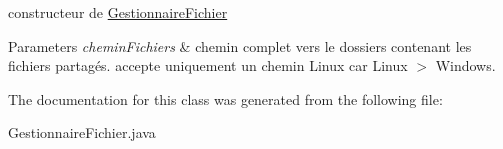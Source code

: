 constructeur de \hyperlink{classcommon_1_1GestionnaireFichier}{Gestionnaire\+Fichier} 


\begin{DoxyParams}{Parameters}
{\em chemin\+Fichiers} & chemin complet vers le dossiers contenant les fichiers partagés. accepte uniquement un chemin Linux car Linux $>$ Windows. \\
\hline
\end{DoxyParams}


The documentation for this class was generated from the following file\+:\begin{DoxyCompactItemize}
\item 
Gestionnaire\+Fichier.\+java\end{DoxyCompactItemize}
